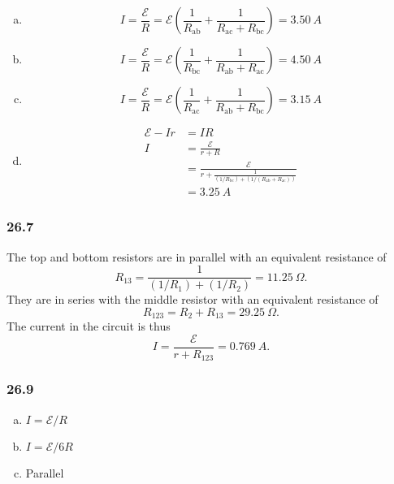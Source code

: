 \documentclass{article}
\begin{document}
\begin{enumerate}[(a)]
  \item \[I = \frac{\mathcal{E}}{R} = \mathcal{E} \left( \frac{1}{R_\textrm{ab}} + \frac{1}{R_\textrm{ac} + R_\textrm{bc}} \right) = \qty{3.50}{A}\]

  \item \[I = \frac{\mathcal{E}}{R} = \mathcal{E} \left( \frac{1}{R_\textrm{bc}} + \frac{1}{R_\textrm{ab} + R_\textrm{ac}} \right) = \qty{4.50}{A}\]

  \item \[I = \frac{\mathcal{E}}{R} = \mathcal{E} \left( \frac{1}{R_\textrm{ac}} + \frac{1}{R_\textrm{ab} + R_\textrm{bc}} \right) = \qty{3.15}{A}\]

  \item

        \begin{align*}
          \mathcal{E} - I r & = I R                                                                                           \\
          I                 & = \frac{\mathcal{E}}{r + R}                                                                     \\
                            & = \frac{\mathcal{E}}{r + \frac{1}{(1 / R_\textrm{bc}) + (1 / (R_\textrm{ab} + R_\textrm{ac}))}} \\
                            & = \qty{3.25}{A}
        \end{align*}
\end{enumerate}

\subsubsection{26.7}

The top and bottom resistors are in parallel with an equivalent resistance of \[R_{13} = \frac{1}{(1 / R_1) + (1 / R_2)} = \qty{11.25}{\Omega}.\] They are in series with the middle resistor with an equivalent resistance of \[R_{123} = R_2 + R_{13} = \qty{29.25}{\Omega}.\] The current in the circuit is thus \[I = \frac{\mathcal{E}}{r + R_{123}} = \qty{0.769}{A}.\]

\subsubsection{26.9}

\begin{enumerate}[(a)]
  \item $I = \mathcal{E} / R$

  \item $I = \mathcal{E} / 6 R$

  \item Parallel
\end{enumerate}
\end{document}
